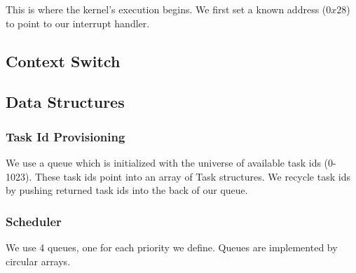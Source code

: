 \documentclass[letterpaper]{article}
\begin{document}
This is where the kernel's execution begins. We first set a known address ($0x28$) to point to our interrupt handler.

\subsection{Context Switch}

\subsection{Data Structures}

\subsubsection{Task Id Provisioning}
We use a queue which is initialized with the universe of available task ids (0-1023). These task ids point into an array
of Task structures. We recycle task ids by pushing returned task ids into the back of our queue.

\subsubsection{Scheduler}
We use 4 queues, one for each priority we define. Queues are implemented by circular arrays.
\end{document}
